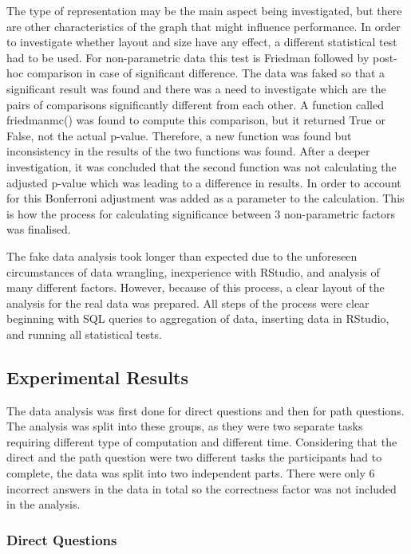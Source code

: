 \documentclass{l4proj}
\begin{document}
The type of representation may be the main aspect being investigated, but there are other characteristics of the graph that might influence performance. In order to investigate whether layout and size have any effect, a different statistical test had to be used. For non-parametric data this test is Friedman followed by post-hoc comparison in case of significant difference. The data was faked so that a significant result was found and there was a need to investigate which are the pairs of comparisons significantly different from each other. A function called friedmanmc() was found to compute this comparison, but it returned True or False, not the actual p-value. Therefore, a new function was found but inconsistency in the results of the two functions was found. After a deeper investigation, it was concluded that the second function was not calculating the adjusted p-value which was leading to a difference in results. In order to account for this Bonferroni adjustment was added as a parameter to the calculation. This is how the process for calculating significance between 3  non-parametric factors was finalised. 

The fake data analysis took longer than expected due to the unforeseen circumstances of data wrangling, inexperience with RStudio, and analysis of many different factors. However, because of this process, a clear layout of the analysis for the real data was prepared. All steps of the process were clear beginning with SQL queries to aggregation of data, inserting data in RStudio, and running all statistical tests.

\subsection{Experimental Results}

The data analysis was first done for direct questions and then for path questions. The analysis was split into these groups, as they were two separate tasks requiring different type of computation and different time. Considering that the direct and the path question were two different tasks the participants had to complete, the data was split into two independent parts. There were only 6 incorrect answers in the data in total so the correctness factor was not included in the analysis.

\bigskip
\bigskip

\subsubsection{Direct Questions}
\end{document}
